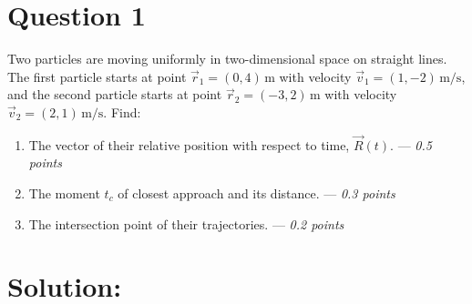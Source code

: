 \section*{Question 1}
Two particles are moving uniformly in two-dimensional space on straight lines. The first particle starts at point $\vec{r}_1 = (0, 4) \, \text{m}$ with velocity $\vec{v}_1 = (1, -2) \, \text{m/s}$, and the second particle starts at point $\vec{r}_2 = (-3, 2) \, \text{m}$ with velocity $\vec{v}_2 = (2, 1) \, \text{m/s}$. Find:
\begin{enumerate}
    \item[(a)] The vector of their relative position with respect to time, $\vec{R}(t)$. --- \textit{0.5 points}
    \item[(b)] The moment $t_c$ of closest approach and its distance. --- \textit{0.3 points}
    \item[(c)] The intersection point of their trajectories. --- \textit{0.2 points}
\end{enumerate}




\section*{Solution:}